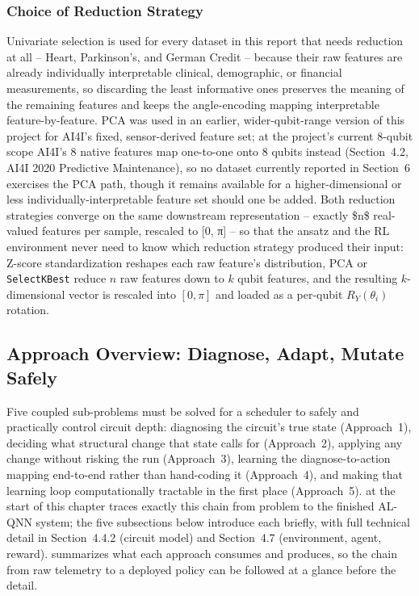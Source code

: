 \subsubsection{Choice of Reduction Strategy}
Univariate selection is used for every dataset in this report that needs reduction at all -- Heart, Parkinson's, and German Credit -- because their raw features are already individually interpretable clinical, demographic, or financial measurements, so discarding the least informative ones preserves the meaning of the remaining features and keeps the angle-encoding mapping interpretable feature-by-feature. PCA was used in an earlier, wider-qubit-range version of this project for AI4I's fixed, sensor-derived feature set; at the project's current 8-qubit scope AI4I's 8 native features map one-to-one onto 8 qubits instead (Section~4.2, AI4I 2020 Predictive Maintenance), so no dataset currently reported in Section~6 exercises the PCA path, though it remains available for a higher-dimensional or less individually-interpretable feature set should one be added. Both reduction strategies converge on the same downstream representation -- exactly \$n\$ real-valued features per sample, rescaled to [0, π] -- so that the ansatz and the RL environment never need to know which reduction strategy produced their input: Z-score standardization reshapes each raw feature's distribution, PCA or \texttt{SelectKBest} reduce $n$ raw features down to $k$ qubit features, and the resulting $k$-dimensional vector is rescaled into $[0,\pi]$ and loaded as a per-qubit $R_Y(\theta_i)$ rotation.

\subsection{Approach Overview: Diagnose, Adapt, Mutate Safely}
\quad Five coupled sub-problems must be solved for a scheduler to safely and practically control circuit depth: diagnosing the circuit's true state (Approach~1), deciding what structural change that state calls for (Approach~2), applying any change without risking the run (Approach~3), learning the diagnose-to-action mapping end-to-end rather than hand-coding it (Approach~4), and making that learning loop computationally tractable in the first place (Approach~5).  at the start of this chapter traces exactly this chain from problem to the finished AL-QNN system; the five subsections below introduce each briefly, with full technical detail in Section~4.4.2 (circuit model) and Section~4.7 (environment, agent, reward).  summarizes what each approach consumes and produces, so the chain from raw telemetry to a deployed policy can be followed at a glance before the detail.

